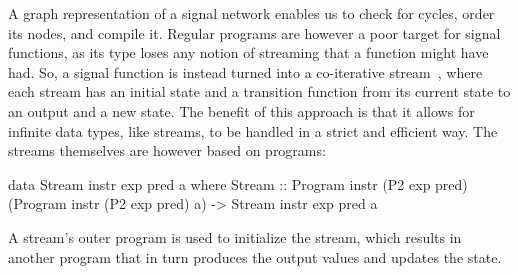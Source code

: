 \documentclass[../paper.tex]{subfiles}
\begin{document}
A graph representation of a signal network enables us to check for cycles, order its nodes, and compile it. Regular programs are however a poor target for signal functions, as its type loses any notion of streaming that a function might have had. So, a signal function is instead turned into a co-iterative stream~\cite{caspi1998}, where each stream has an initial state and a transition function from its current state to an output and a new state. The benefit of this approach is that it allows for infinite data types, like streams, to be handled in a strict and efficient way. The streams themselves are however based on programs:

\begin{code}
data Stream instr exp pred a where
  Stream :: Program instr (P2 exp pred) (Program instr (P2 exp pred) a)
    -> Stream instr exp pred a
\end{code}

\noindent A stream's outer program is used to initialize the stream, which results in another program that in turn produces the output values and updates the state.
\end{document}
